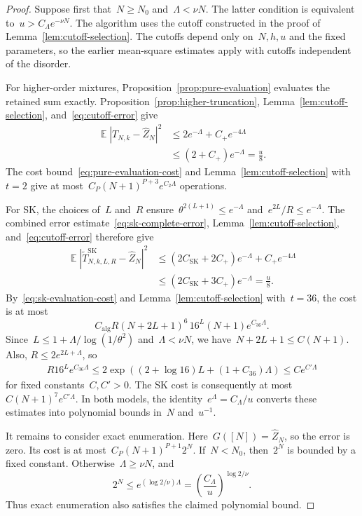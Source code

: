 \documentclass[letterpaper,11pt,reqno]{amsart}
\renewcommand{\leq}{\leqslant}
\renewcommand{\geq}{\geqslant}
\DeclareMathOperator{\E}{\mathds{E}}
\begin{document}
\begin{proof}
Suppose first that~$N\geq N_0$ and~$\Lambda<\nu N$. The latter condition is equivalent to~$u>C_\Lambda e^{-\nu N}$. The algorithm uses the cutoff constructed in the proof of Lemma~\ref{lem:cutoff-selection}. The cutoffs depend only on~$N,h,u$ and the fixed parameters, so the earlier mean-square estimates apply with cutoffs independent of the disorder.

For higher-order mixtures, Proposition~\ref{prop:pure-evaluation} evaluates the retained sum exactly. Proposition~\ref{prop:higher-truncation}, Lemma~\ref{lem:cutoff-selection}, and~\eqref{eq:cutoff-error} give
\begin{align*}
\E|T_{N,k}-\widehat Z_N|^2
&\leq2e^{-\Lambda}+C_+e^{-4\Lambda}\\
&\leq(2+C_+)e^{-\Lambda}=\frac u8.
\end{align*}
The cost bound~\eqref{eq:pure-evaluation-cost} and Lemma~\ref{lem:cutoff-selection} with~$t=2$ give at most~$C_P(N+1)^{P+3}e^{C_2\Lambda}$ operations.

For SK, the choices of~$L$ and~$R$ ensure~$\theta^{2(L+1)}\leq e^{-\Lambda}$ and~$e^{2L}/R\leq e^{-\Lambda}$. The combined error estimate~\eqref{eq:sk-complete-error}, Lemma~\ref{lem:cutoff-selection}, and~\eqref{eq:cutoff-error} therefore give
\begin{align*}
\E\left|\widetilde T^{\mathrm{SK}}_{N,k,L,R}-\widehat Z_N\right|^2
&\leq(2C_{\mathrm{SK}}+2C_+)e^{-\Lambda}+C_+e^{-4\Lambda}\\
&\leq(2C_{\mathrm{SK}}+3C_+)e^{-\Lambda}=\frac u8.
\end{align*}
By~\eqref{eq:sk-evaluation-cost} and Lemma~\ref{lem:cutoff-selection} with~$t=36$, the cost is at most
\begin{equation*}
C_{\mathrm{alg}}R(N+2L+1)^6\,16^L(N+1)e^{C_{36}\Lambda}.
\end{equation*}
Since~$L\leq1+\Lambda/\log(1/\theta^2)$ and~$\Lambda<\nu N$, we have~$N+2L+1\leq C(N+1)$. Also, $R\leq2e^{2L+\Lambda}$, so
\begin{align*}
R16^Le^{C_{36}\Lambda}
\leq2\exp\left((2+\log16)L+(1+C_{36})\Lambda\right)
\leq Ce^{C'\Lambda}
\end{align*}
for fixed constants~$C,C'>0$. The SK cost is consequently at most~$C(N+1)^7e^{C'\Lambda}$. In both models, the identity~$e^\Lambda=C_\Lambda/u$ converts these estimates into polynomial bounds in~$N$ and~$u^{-1}$.

It remains to consider exact enumeration. Here~$G([N])=\widehat Z_N$, so the error is zero. Its cost is at most~$C_P(N+1)^{P+1}2^N$. If~$N<N_0$, then~$2^N$ is bounded by a fixed constant. Otherwise~$\Lambda\geq\nu N$, and
\begin{equation}\label{eq:exact-enumeration-cost}
2^N\leq e^{(\log2/\nu)\Lambda}
=\left(\frac{C_\Lambda}{u}\right)^{\log2/\nu}.
\end{equation}
Thus exact enumeration also satisfies the claimed polynomial bound.


\end{proof}
\end{document}
